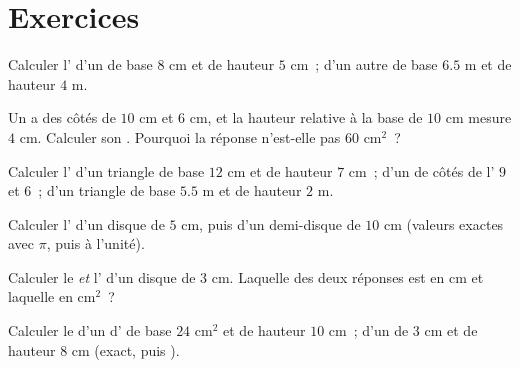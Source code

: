 \section{Exercices}

\begin{exercise}[$\star$]\label{exo:g7:areas:1}
Calculer l' d'un  de base $8$ cm et de hauteur
$5$ cm~; d'un autre de base $6.5$ m et de hauteur $4$ m.
\end{exercise}

\begin{exercise}[$\star$]\label{exo:g7:areas:2}
Un  a des côtés de $10$ cm et $6$ cm, et la hauteur
relative à la base de $10$ cm mesure $4$ cm. Calculer son .
Pourquoi la réponse n'est-elle pas $60$ cm$^2$~?
\end{exercise}

\begin{exercise}[$\star$]\label{exo:g7:areas:3}
Calculer l' d'un triangle de base $12$ cm et de hauteur $7$ cm~;
d'un  de côtés de l' $9$ et $6$~; d'un
triangle de base $5.5$ m et de hauteur $2$ m.
\end{exercise}

\begin{exercise}[$\star$]\label{exo:g7:areas:4}
Calculer l' d'un disque de  $5$ cm, puis d'un demi-disque de
 $10$ cm (valeurs exactes avec $\pi$, puis  à l'unité).
\end{exercise}

\begin{exercise}[$\star$]\label{exo:g7:areas:5}
Calculer le  \emph{et} l' d'un disque de  $3$ cm.
Laquelle des deux réponses est en cm et laquelle en cm$^2$~?
\end{exercise}

\begin{exercise}[$\star$]\label{exo:g7:areas:6}
Calculer le  d'un  d' de base $24$ cm$^2$ et de
hauteur $10$ cm~; d'un  de  $3$ cm et de hauteur $8$ cm
(exact, puis ).
\end{exercise}

